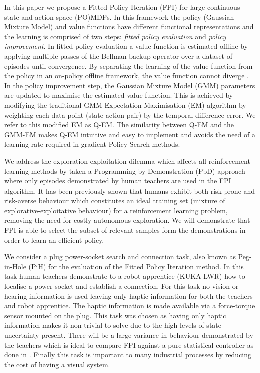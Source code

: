 \documentclass[final,5p,times,twocolumn]{elsarticle}
\begin{document}
In this paper we propose a Fitted Policy Iteration (FPI) for large continuous state and action space 
(PO)MDPs. In this framework the policy (Gaussian Mixture Model) and value functions have different 
functional representations and the learning is comprised of two steps: \textit{fitted policy evaluation} and \textit{policy improvement}. 
In fitted policy evaluation a value function is estimated offline by applying multiple passes of 
the Bellman backup operator over a dataset of episodes until convergence. 
By separating the learning of the value function from the policy in an on-policy offline framework, 
the value function cannot diverge \cite{stable_FA_gordon_1995,LSPI_2003}. 
In the policy improvement step,  the Gaussian Mixture Model (GMM) parameters are updated 
to maximise the estimated value function. This is achieved by modifying the traditional GMM 
Expectation-Maximisation (EM) algorithm \cite{Bilmes97agentle}
by weighting each data point (state-action pair) by the temporal difference error. 
We refer to this modified EM as Q-EM. The similarity between Q-EM and the GMM-EM makes Q-EM 
intuitive and easy to implement and avoids the need of a learning rate required in gradient 
Policy Search methods.

We address the exploration-exploitation dilemma which affects all reinforcement learning methods by taken 
a Programming by Demonstration (PbD) approach where only episodes demonstrated by human teachers 
are used in the FPI algorithm. It has been previously shown \cite{Chambrier2014} 
that humans exhibit both risk-prone and risk-averse behaviour which constitutes an ideal training set 
(mixture of explorative-exploitative behaviour) for a reinforcement learning problem, removing the 
need for costly autonomous exploration. We will demonstrate that FPI is able to select the subset of 
relevant samples form the demonstrations in order to learn an efficient policy.

We consider a plug power-socket search and connection task, also known as Peg-in-Hole 
(PiH)\cite{search_strategies_icra_2001} for the evaluation of the Fitted Policy Iteration method. 
In this task human teachers demonstrate to a robot apprentice (KUKA LWR) how to localise a power
socket and establish a connection. For this task no vision or hearing information is used leaving 
only haptic information for both the teachers and robot apprentice. The haptic information is 
made available via a force-torque sensor mounted on the plug. This task was chosen as having 
only haptic information makes it non trivial to solve due to the high levels of state uncertainty present. 
There will be a large variance in behaviour demonstrated by the teachers which is 
ideal to compare FPI against a pure statistical controller as done in \cite{Chambrier2014}. 
Finally this task is important to many industrial processes by reducing the cost of having 
a visual system.
\end{document}
